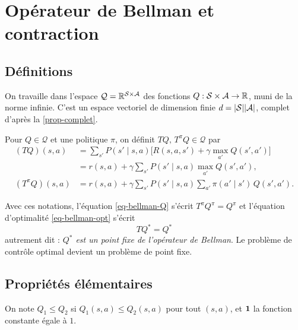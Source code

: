 \section{Opérateur de Bellman et contraction}\label{sec-operateur}

\subsection{Définitions}

On travaille dans l'espace $\mathcal{Q}=\mathbb{R}^{\mathcal{S}\times\mathcal{A}}$ des fonctions $Q:\mathcal{S}\times\mathcal{A}\to\mathbb{R}$, muni de la norme infinie. C'est un espace vectoriel de dimension finie $d=|\mathcal{S}||\mathcal{A}|$, complet d'après la \cref{prop-complet}.

\begin{definition}
Pour $Q\in\mathcal{Q}$ et une politique $\pi$, on définit $TQ,\,T^\pi Q\in\mathcal Q$ par
\begin{align*}
(TQ)(s,a)&=\sum_{s'}P(s'\mid s,a)\Big[R(s,a,s')+\gamma\max_{a'}Q(s',a')\Big]\\
&=r(s,a)+\gamma\sum_{s'}P(s'\mid s,a)\max_{a'}Q(s',a'),\\
(T^\pi Q)(s,a)&=r(s,a)+\gamma\sum_{s'}P(s'\mid s,a)\sum_{a'}\pi(a'\mid s')\,Q(s',a').
\end{align*}
\end{definition}

Avec ces notations, l'équation \eqref{eq-bellman-Q} s'écrit $T^\pi Q^\pi=Q^\pi$ et l'équation d'optimalité \eqref{eq-bellman-opt} s'écrit
\[
\boxed{TQ^*=Q^*}
\]
autrement dit : \emph{$Q^*$ est un point fixe de l'opérateur de Bellman}. Le problème de contrôle optimal devient un problème de point fixe.

\subsection{Propriétés élémentaires}

On note $Q_1\le Q_2$ si $Q_1(s,a)\le Q_2(s,a)$ pour tout $(s,a)$, et $\mathbf{1}$ la fonction constante égale à $1$.

